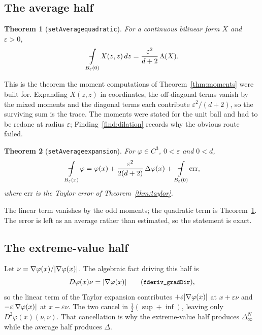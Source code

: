 \documentclass[11pt,reqno]{amsart}
\newcommand{\fint}{\mathop{\mathrlap{\,\rule[0.62ex]{0.62em}{0.5pt}}\int}}
\newcommand{\LEANREF}[1]{\texttt{\small\def\_{\textunderscore\allowbreak}#1}}
\newcommand{\eps}{\varepsilon}
\newcommand{\dlap}{\Delta}
\newcommand{\inflap}{\Delta_\infty^{N}}
\newcommand{\avgint}{\fint}
\DeclarePairedDelimiter{\abs}{\lvert}{\rvert}
\theoremstyle{plain}
\newtheorem{theorem}{Theorem}[section]
\theoremstyle{definition}
\begin{document}
\subsection{The average half}

\begin{theorem}[\LEANREF{setAverage\_quadratic}]\label{thm:quadavg}
For a continuous bilinear form $X$ and $\eps > 0$,
\[
  \avgint_{B_\eps(0)} X(z,z)\,dz = \frac{\eps^2}{d+2}\,\Lambda(X) .
\]
\end{theorem}

This is the theorem the moment computations of Theorem~\ref{thm:moments} were
built for. Expanding $X(z,z)$ in coordinates, the off-diagonal terms vanish by
the mixed moments and the diagonal terms each contribute $\eps^2/(d+2)$, so
the surviving sum is the trace. The moments were stated for the unit ball and
had to be redone at radius $\eps$; Finding~\ref{find:dilation} records why the
obvious route failed.

\begin{theorem}[\LEANREF{setAverage\_expansion}]\label{thm:avgexp}
For $\varphi \in C^3$, $0 < \eps$ and $0 < d$,
\[
  \avgint_{B_\eps(x)} \varphi
    = \varphi(x) + \frac{\eps^2}{2(d+2)}\,\dlap\varphi(x)
      + \avgint_{B_\eps(0)} \mathrm{err} ,
\]
where $\mathrm{err}$ is the Taylor error of Theorem~\ref{thm:taylor}.
\end{theorem}

The linear term vanishes by the odd moments; the quadratic term is
Theorem~\ref{thm:quadavg}. The error is left as an average rather than
estimated, so the statement is exact.

\subsection{The extreme-value half}

Let $\nu = \nabla\varphi(x)/\abs{\nabla\varphi(x)}$. The algebraic fact
driving this half is
\begin{equation}\label{eq:graddir}
  D\varphi(x)\nu = \abs{\nabla\varphi(x)}
  \qquad (\LEANREF{fderiv\_gradDir}),
\end{equation}
so the linear term of the Taylor expansion contributes
$+\eps\abs{\nabla\varphi(x)}$ at $x + \eps\nu$ and
$-\eps\abs{\nabla\varphi(x)}$ at $x - \eps\nu$. The two cancel in
$\tfrac12(\sup + \inf)$, leaving only $D^2\varphi(x)(\nu,\nu)$. That
cancellation is why the extreme-value half produces $\inflap$ while the
average half produces $\dlap$.
\end{document}
